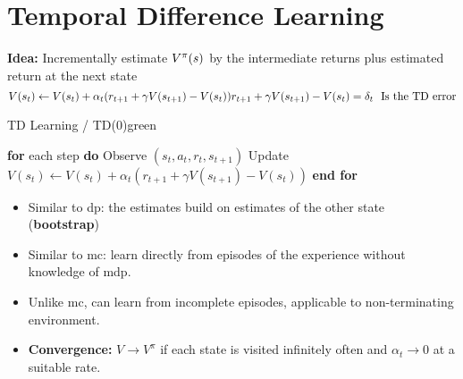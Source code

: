 \section{Temporal Difference Learning}
\textbf{Idea: }Incrementally estimate $V^\pi(s)$ by the intermediate returns plus estimated return at the next state
\begin{equation*}
V(s_t) \leftarrow V(s_t) +\alpha_t(r_{t+1}+\gamma V(s_{t+1})-V(s_t))\\
r_{t+1}+\gamma V(s_{t+1})-V(s_t) = \delta_t \ \ \text{Is the TD error} 
\end{equation*}

\begin{mybox}{TD Learning / TD(0)}{green}
\begin{algorithmic}[1]
\STATE \textbf{for} each step \textbf{do}
\STATE \hspace{0.5cm} Observe $(s_t,a_t,r_t,s_{t+1})$
\STATE \hspace{0.5cm} Update $V(s_t) \leftarrow V(s_t) +\alpha_t(r_{t+1}+\gamma V(s_{t+1})-V(s_t))$
\STATE \textbf{end for}
\end{algorithmic}
\end{mybox}

\begin{itemize}
\item Similar to \gls{dp}: the estimates build on estimates of the other state (\textbf{bootstrap})
\item Similar to \gls{mc}: learn directly from episodes of the experience without knowledge of \gls{mdp}.
\item Unlike \gls{mc}, can learn from incomplete episodes, applicable to non-terminating environment.
\item \textbf{Convergence: }$V \rightarrow V^\pi$ if each state is visited infinitely often and $\alpha_t\rightarrow 0$ at a suitable rate. 
\end{itemize}
